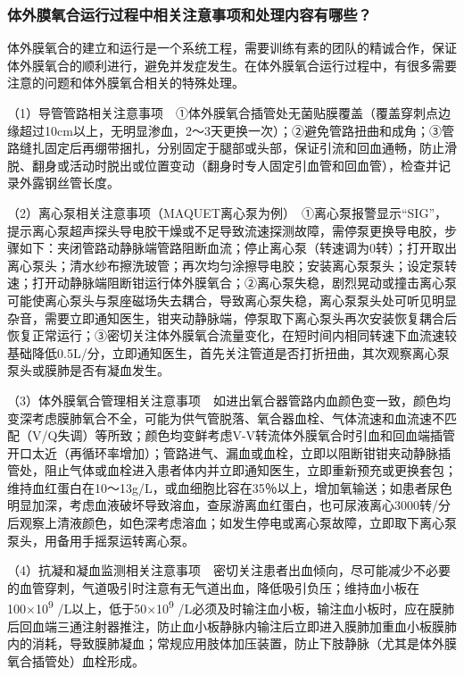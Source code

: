 \subsubsection{体外膜氧合运行过程中相关注意事项和处理内容有哪些？}

体外膜氧合的建立和运行是一个系统工程，需要训练有素的团队的精诚合作，保证体外膜氧合的顺利进行，避免并发症发生。在体外膜氧合运行过程中，有很多需要注意的问题和体外膜氧合相关的特殊处理。

（1）导管管路相关注意事项　①体外膜氧合插管处无菌贴膜覆盖（覆盖穿刺点边缘超过10cm以上，无明显渗血，2～3天更换一次）；②避免管路扭曲和成角；③管路缝扎固定后再绷带捆扎，分别固定于腿部或头部，保证引流和回血通畅，防止滑脱、翻身或活动时脱出或位置变动（翻身时专人固定引血管和回血管），检查并记录外露钢丝管长度。

（2）离心泵相关注意事项（MAQUET离心泵为例）　①离心泵报警显示“SIG”，提示离心泵超声探头导电胶干燥或不足导致流速探测故障，需停泵更换导电胶，步骤如下：夹闭管路动静脉端管路阻断血流；停止离心泵（转速调为0转）；打开取出离心泵头；清水纱布擦洗玻管；再次均匀涂擦导电胶；安装离心泵泵头；设定泵转速；打开动静脉端阻断钳运行体外膜氧合；②离心泵失稳，剧烈晃动或撞击离心泵可能使离心泵头与泵座磁场失去耦合，导致离心泵失稳，离心泵泵头处可听见明显杂音，需要立即通知医生，钳夹动静脉端，停泵取下离心泵头再次安装恢复耦合后恢复正常运行；③密切关注体外膜氧合流量变化，在短时间内相同转速下血流速较基础降低0.5L/分，立即通知医生，首先关注管道是否打折扭曲，其次观察离心泵泵头或膜肺是否有凝血发生。

（3）体外膜氧合管理相关注意事项　如进出氧合器管路内血颜色变一致，颜色均变深考虑膜肺氧合不全，可能为供气管脱落、氧合器血栓、气体流速和血流速不匹配（V/Q失调）等所致；颜色均变鲜考虑V-V转流体外膜氧合时引血和回血端插管开口太近（再循环率增加）；管路进气、漏血或血栓，立即以阻断钳钳夹动静脉插管处，阻止气体或血栓进入患者体内并立即通知医生，立即重新预充或更换套包；维持血红蛋白在10～13g/L，或血细胞比容在35％以上，增加氧输送；如患者尿色明显加深，考虑血液破坏导致溶血，查尿游离血红蛋白，也可尿液离心3000转/分后观察上清液颜色，如色深考虑溶血；如发生停电或离心泵故障，立即取下离心泵泵头，用备用手摇泵运转离心泵。

（4）抗凝和凝血监测相关注意事项　密切关注患者出血倾向，尽可能减少不必要的血管穿刺，气道吸引时注意有无气道出血，降低吸引负压；维持血小板在100×10\textsuperscript{9}
/L以上，低于50×10\textsuperscript{9}
/L必须及时输注血小板，输注血小板时，应在膜肺后回血端三通注射器推注，防止血小板静脉内输注后立即进入膜肺加重血小板膜肺内的消耗，导致膜肺凝血；常规应用肢体加压装置，防止下肢静脉（尤其是体外膜氧合插管处）血栓形成。

